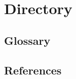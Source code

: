 \chapter{Directory}

\section{Glossary}

\printbibliography

\section{References}

\listoftables

\listoffigures